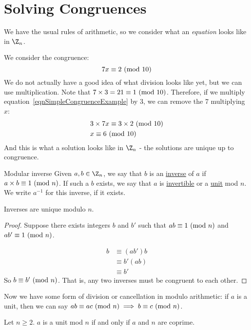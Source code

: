 \documentclass[../Main.tex]{subfiles}
\begin{document}
\section{Solving Congruences}
We have the usual rules of arithmetic, so we consider what an \textit{equation} looks like in $\Z_n$. 
\begin{example}
    We consider the congruence:
    \begin{equation}
        7x \equiv 2~(\text{mod}~{10})
        \label{eqnSimpleCongruenceExample}
    \end{equation}
    We do not actually have a good idea of what division looks like yet, but we can use multiplication. Note that $7 \times 3 = 21 \equiv 1~(\text{mod}~{10})$. Therefore, if we multiply equation~\ref{eqnSimpleCongruenceExample} by 3, we can remove the 7 multiplying $x$:
    \begin{align*}
        &3 \times 7x \equiv 3 \times 2~(\text{mod}~{10}) \\
        &x \equiv 6~(\text{mod}~{10})
    \end{align*}
    And this is what a solution looks like in $\Z_n$ - the solutions are unique up to congruence.
\end{example}
\begin{definition}{Modular inverse}
    Given $a, b \in \Z_n$, we say that $b$ is an \underline{inverse} of $a$ if $a \times b \equiv 1~(\text{mod}~{n})$. If such a $b$ exists, we say that $a$ is \underline{invertible} or a \underline{unit} mod $n$. We write $a^{-1}$ for this inverse, if it exists.
\end{definition}
\begin{proposition}
    Inverses are unique modulo $n$.
\end{proposition}
\begin{proof}
    Suppose there exists integers $b$ and $b'$ such that $ab \equiv 1~(\text{mod}~{n})$ and $ab' \equiv 1~(\text{mod}~{n})$.\par
    \begin{align*}
        b &\equiv (ab')b \\
        &\equiv b'(ab) \\
        &\equiv b'
    \end{align*}
    So $b \equiv b'~(\text{mod}~{n})$. That is, any two inverses must be congruent to each other.
\end{proof}
Now we have some form of division or cancellation in modulo arithmetic: if $a$ is a unit, then we can say $ab \equiv ac~(\text{mod}~{n}) \implies b \equiv c~(\text{mod}~{n})$.
\begin{proposition}
    Let $n \geq 2$. $a$ is a unit mod $n$ if and only if $a$ and $n$ are coprime.
    \label{propUnitsCoprimes}
\end{proposition}
\end{document}
